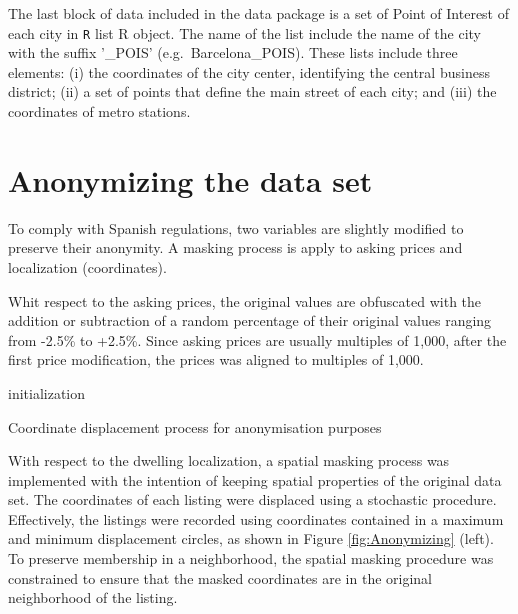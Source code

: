 \documentclass[Royal,times,sageh]{sagej}
\begin{document}
The last block of data included in the data package is a set of Point of
Interest of each city in \texttt{R} list R object. The name of the list
include the name of the city with the suffix '\_POIS'
(e.g.~Barcelona\_POIS). These lists include three elements: (i) the
coordinates of the city center, identifying the central business
district; (ii) a set of points that define the main street of each city;
and (iii) the coordinates of metro stations.

\hypertarget{anonymizing}{%
\section{Anonymizing the data set}\label{anonymizing}}

To comply with Spanish regulations, two variables are slightly modified
to preserve their anonymity. A masking process is apply to asking prices
and localization (coordinates).

Whit respect to the asking prices, the original values are obfuscated
with the addition or subtraction of a random percentage of their
original values ranging from -2.5\% to +2.5\%. Since asking prices are
usually multiples of 1,000, after the first price modification, the
prices was aligned to multiples of 1,000.

\begin{algorithm}[!ht]
 initialization\;
 \caption{Coordinate displacement process for anonymisation purposes}
 \label{algo:coordinates-displacement}
\end{algorithm}

With respect to the dwelling localization, a spatial masking process was
implemented with the intention of keeping spatial properties of the
original data set. The coordinates of each listing were displaced using
a stochastic procedure. Effectively, the listings were recorded using
coordinates contained in a maximum and minimum displacement circles, as
shown in Figure \ref{fig:Anonymizing} (left). To preserve membership in
a neighborhood, the spatial masking procedure was constrained to ensure
that the masked coordinates are in the original neighborhood of the
listing.
\end{document}
